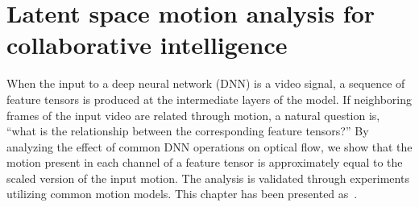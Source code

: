 \chapter{Latent space motion analysis for collaborative intelligence}
\label{ch:video_latent_space_motion_analysis}

%
%
%




%








\begin{chapabstract}
When the input to a deep neural network (DNN) is a video signal, a sequence of feature tensors is produced at the intermediate layers of the model. If neighboring frames of the input video are related through motion, a natural question is, ``what is the relationship between the corresponding feature tensors?'' By analyzing the effect of common DNN operations on optical flow, we show that the motion present in each channel of a feature tensor is approximately equal to the scaled version of the input motion. The analysis is validated through experiments utilizing common motion models. %
This chapter has been presented as~\cite{ulhaq2021analysis}.
\end{chapabstract}


